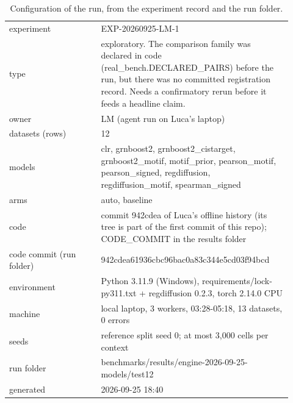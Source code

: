 \begin{table}[H]\centering\small
\caption{Configuration of the run, from the experiment record and the run folder.}
\begin{tabular}{p{0.3\linewidth}p{0.62\linewidth}}\toprule
experiment & EXP-20260925-LM-1 \\
type & exploratory. The comparison family was declared in code (real\_bench.DECLARED\_PAIRS) before the run, but there was no committed registration record. Needs a confirmatory rerun before it feeds a headline claim. \\
owner & LM (agent run on Luca's laptop) \\
datasets (rows) & 12 \\
models & clr, grnboost2, grnboost2\_cistarget, grnboost2\_motif, motif\_prior, pearson\_motif, pearson\_signed, regdiffusion, regdiffusion\_motif, spearman\_signed \\
arms & auto, baseline \\
code & commit 942cdea of Luca's offline history (its tree is part of the first commit of this repo); CODE\_COMMIT in the results folder \\
code commit (run folder) & 942cdea61936cbc96bac0a83c344e5cd03f94bcd \\
environment & Python 3.11.9 (Windows), requirements/lock-py311.txt + regdiffusion 0.2.3, torch 2.14.0 CPU \\
machine & local laptop, 3 workers, 03:28-05:18, 13 datasets, 0 errors \\
seeds & reference split seed 0; at most 3,000 cells per context \\
run folder & benchmarks/results/engine-2026-09-25-models/test12 \\
generated & 2026-09-25 18:40 \\
\bottomrule\end{tabular}\end{table}
